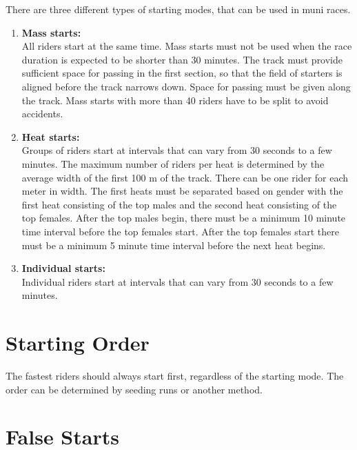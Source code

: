 There are three different types of starting modes, that can be used in muni races.
\begin{enumerate}
\item \textbf{Mass starts:}\\
All riders start at the same time.
Mass starts must not be used when the race duration is expected to be shorter than 30 minutes.
The track must provide sufficient space for passing in the first section, so that the field of starters is aligned before the track narrows down.
Space for passing must be given along the track.
Mass starts with more than 40 riders have to be split to avoid accidents.
\item \textbf{Heat starts:}\\
Groups of riders start at intervals that can vary from 30 seconds to a few minutes.
The maximum number of riders per heat is determined by the average width of the first 100 m of the track.
There can be one rider for each meter in width.
The first heats must be separated based on gender with the first heat consisting of the top males and the second heat consisting of the top females.
After the top males begin, there must be a minimum 10 minute time interval before the top females start.
After the top females start there must be a minimum 5 minute time interval before the next heat begins.
\item \textbf{Individual starts:}\\
Individual riders start at intervals that can vary from 30 seconds to a few minutes.
\end{enumerate}

\section{Starting Order}

The fastest riders should always start first, regardless of the starting mode.
The order can be determined by seeding runs or another method.

\section{False Starts}


